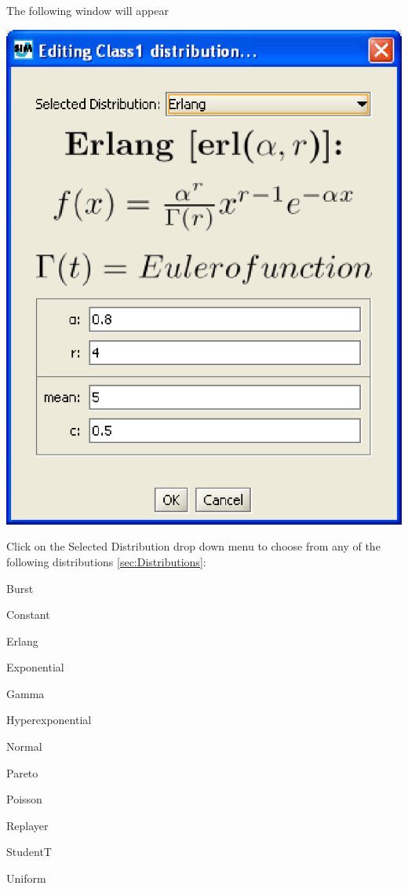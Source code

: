 The following window will appear
\begin{center}
\includegraphics[scale=.5]{img/jsim/erlang.eps}
\end{center}

Click on the Selected Distribution drop down menu to choose from any of the following
distributions \ref{sec:Distributions}:
\begin{itemize*}
    \item Burst
    \item Constant
    \item Erlang
    \item Exponential
    \item Gamma
    \item Hyperexponential
    \item Normal
    \item Pareto
    \item Poisson
    \item Replayer
    \item StudentT
    \item Uniform
\end{itemize*}

